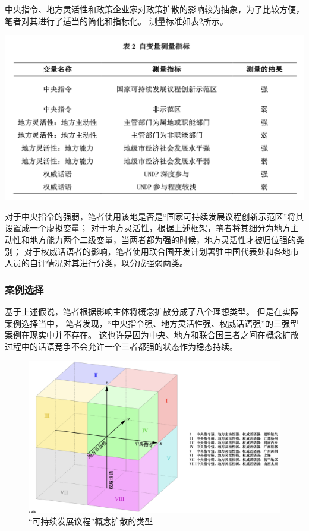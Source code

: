 \documentclass[
  12pt,
]{ctexart}
\begin{document}
中央指令、地方灵活性和政策企业家对政策扩散的影响较为抽象，为了比较方便，笔者对其进行了适当的简化和指标化。
测量标准如表2所示。

\begin{center}\includegraphics[width=0.9\linewidth]{../figures/table2} \end{center}

对于中央指令的强弱，笔者使用该地是否是``国家可持续发展议程创新示范区''将其设置成一个虚拟变量；
对于地方灵活性，根据上述框架，笔者将其细分为地方主动性和地方能力两个二级变量，当两者都为强的时候，地方灵活性才被归位强的类别；
对于权威话语者的影响，笔者使用联合国开发计划署驻中国代表处和各地市人员的自评情况对其进行分类，以分成强弱两类。

\hypertarget{ux6848ux4f8bux9009ux62e9}{%
\subsubsection{案例选择}\label{ux6848ux4f8bux9009ux62e9}}

基于上述假说，笔者根据影响主体将概念扩散分成了八个理想类型。
但是在实际案例选择当中，
笔者发现，``中央指令强、地方灵活性强、权威话语强''的三强型案例在现实中并不存在。
这也许是因为中央、地方和联合国三者之间在概念扩散过程中的话语竞争不会允许一个三者都强的状态作为稳态持续。

\begin{figure}

{\centering \includegraphics[width=0.9\linewidth]{../figures/figure3} 

}

\caption{“可持续发展议程”概念扩散的类型}\label{fig:unnamed-chunk-5}
\end{figure}
\end{document}
